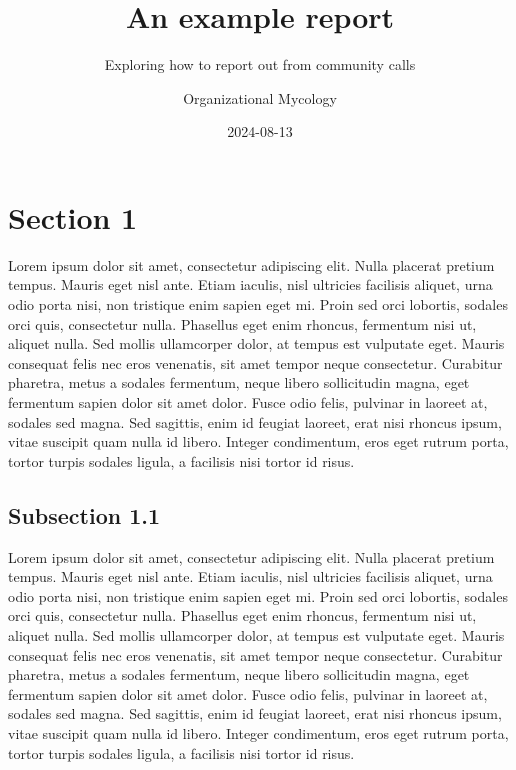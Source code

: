 \documentclass[
  letterpaper,
  DIV=11,
  numbers=noendperiod,
  oneside]{scrartcl}
\title{An example report}
\subtitle{Exploring how to report out from community calls}
\author{Organizational Mycology}
\date{2024-08-13}
\begin{document}
\maketitle


\section{Section 1}\label{section-1}

Lorem ipsum dolor sit amet, consectetur adipiscing elit. Nulla placerat
pretium tempus. Mauris eget nisl ante. Etiam iaculis, nisl ultricies
facilisis aliquet, urna odio porta nisi, non tristique enim sapien eget
mi. Proin sed orci lobortis, sodales orci quis, consectetur nulla.
Phasellus eget enim rhoncus, fermentum nisi ut, aliquet nulla. Sed
mollis ullamcorper dolor, at tempus est vulputate eget. Mauris consequat
felis nec eros venenatis, sit amet tempor neque consectetur. Curabitur
pharetra, metus a sodales fermentum, neque libero sollicitudin magna,
eget fermentum sapien dolor sit amet dolor. Fusce odio felis, pulvinar
in laoreet at, sodales sed magna. Sed sagittis, enim id feugiat laoreet,
erat nisi rhoncus ipsum, vitae suscipit quam nulla id libero. Integer
condimentum, eros eget rutrum porta, tortor turpis sodales ligula, a
facilisis nisi tortor id risus. 

\subsection{Subsection 1.1}\label{subsection-1.1}

Lorem ipsum dolor sit amet, consectetur adipiscing elit. Nulla placerat
pretium tempus. Mauris eget nisl ante. Etiam iaculis, nisl ultricies
facilisis aliquet, urna odio porta nisi, non tristique enim sapien eget
mi. Proin sed orci lobortis, sodales orci quis, consectetur nulla.
Phasellus eget enim rhoncus, fermentum nisi ut, aliquet nulla. Sed
mollis ullamcorper dolor, at tempus est vulputate eget. Mauris consequat
felis nec eros venenatis, sit amet tempor neque consectetur. Curabitur
pharetra, metus a sodales fermentum, neque libero sollicitudin magna,
eget fermentum sapien dolor sit amet dolor. Fusce odio felis, pulvinar
in laoreet at, sodales sed magna. Sed sagittis, enim id feugiat laoreet,
erat nisi rhoncus ipsum, vitae suscipit quam nulla id libero. Integer
condimentum, eros eget rutrum porta, tortor turpis sodales ligula, a
facilisis nisi tortor id risus. 
\end{document}
